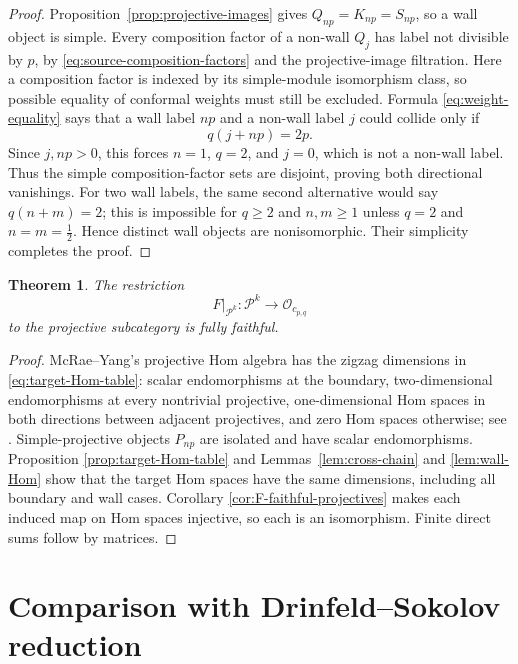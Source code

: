 \documentclass[12pt,leqno]{amsart}
\numberwithin{equation}{section}
\newtheorem{thm}{Theorem}[section]
\newcommand{\Oc}{\mathcal O}
\begin{document}
\begin{proof}
Proposition~\ref{prop:projective-images} gives
$Q_{np}=K_{np}=S_{np}$, so a wall object is simple.  Every composition
factor of a non-wall $Q_j$ has label not divisible by $p$, by
\eqref{eq:source-composition-factors} and the projective-image filtration.
Here a composition factor is indexed by its simple-module isomorphism
class, so possible equality of conformal weights must still be excluded.
Formula \eqref{eq:weight-equality} says that a wall label $np$ and a
non-wall label $j$ could collide only if
\[
 q(j+np)=2p.
\]
Since $j,np>0$, this forces $n=1$, $q=2$, and $j=0$, which is not a
non-wall label.  Thus the simple composition-factor sets are disjoint,
proving both directional vanishings.  For two wall labels, the same second
alternative would say $q(n+m)=2$; this is impossible for $q\geq2$ and
$n,m\geq1$ unless $q=2$ and $n=m=\tfrac12$.  Hence distinct wall objects
are nonisomorphic.  Their simplicity completes the proof.
\end{proof}

\begin{thm}\label{thm:F-fully-faithful}
The restriction
\[
 F|_{\mathcal P^k}:\mathcal P^k\longrightarrow\Oc_{c_{p,q}}
\]
to the projective subcategory is fully faithful.
\end{thm}

\begin{proof}
McRae--Yang's projective Hom algebra has the zigzag dimensions in
\eqref{eq:target-Hom-table}: scalar endomorphisms at the boundary,
two-dimensional endomorphisms at every nontrivial projective, one-dimensional
Hom spaces in both directions between adjacent projectives, and zero Hom
spaces otherwise; see \cite[Sections~4 and 6]{McRaeYang}.  Simple-projective
    objects $P_{np}$ are isolated and have scalar endomorphisms.  Proposition
    \ref{prop:target-Hom-table} and Lemmas~\ref{lem:cross-chain} and
    \ref{lem:wall-Hom} show that the target Hom spaces have the same
    dimensions, including all boundary and wall cases.  Corollary
\ref{cor:F-faithful-projectives} makes each induced map on Hom spaces
injective, so each is an isomorphism.  Finite direct sums follow by matrices.
\end{proof}

\section{Comparison with Drinfeld--Sokolov reduction}\label{sec:comparison}
\end{document}
